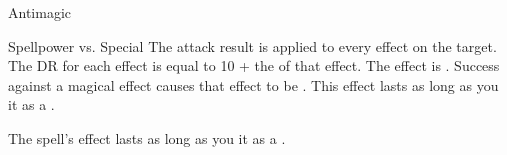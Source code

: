 \begin{spellsection}{Antimagic}
\begin{spellcontent}
\begin{spelltargetinginfo}
\end{spelltargetinginfo}
\begin{spelleffects}
\begin{spellattack}{Spellpower vs. Special}
\spellspecial
The attack result is applied to every  effect on the target.
The DR for each effect is equal to 10 + the  of that effect.
\spellsuccess
The effect is .
Success against a magical effect causes that effect to be .
This effect lasts as long as you  it as a .
\end{spellattack}
\end{spelleffects}
\end{spellcontent}
\begin{spellfooter}
\end{spellfooter}
\begin{spellsubcontent}
\begin{spellcantrip}
The spell's effect lasts as long as you  it as a .
\end{spellcantrip}
\end{spellsubcontent}
\end{spellsection}
